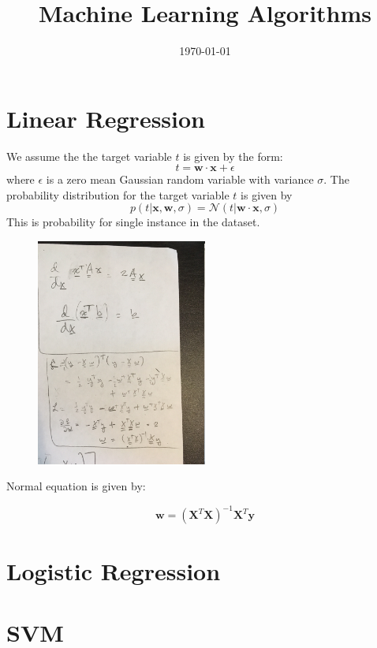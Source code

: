 \documentclass{article}
\title{Machine Learning Algorithms}
\date{\today}
\renewcommand{\vec}[1]{
	\mathbf{#1}
}
\begin{document}
	
	\maketitle
	
	\section*{Linear Regression}
	
	We assume the the target variable $t$ is given by the form:
	\[t = \vec{w}\cdot\vec{x} + \epsilon \]
	where $\epsilon$ is a zero mean Gaussian random variable with variance $\sigma$. The probability distribution for the target variable $t$ is given by 
	\[p(t|\vec{x}, \vec{w}, \sigma) = \mathcal{N}( t| \vec{w}\cdot \vec{x}, \sigma)\]
	This is probability for single instance in the dataset.	
	
	
	\begin{figure}
		\includegraphics[width=0.5\textwidth]{images/linear-regression-normal-equation}
	\end{figure}
	
	Normal equation is given by:

	\[\vec{w} = (\vec{X}^T\vec{X})^{-1}\vec{X}^T\vec{y}\]
    \section*{Logistic Regression}
	
	\section*{SVM}
	
\end{document}

